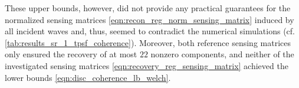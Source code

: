 These upper bounds, however, did not provide
any practical guarantees for
the normalized sensing matrices
\eqref{eqn:recon_reg_norm_sensing_matrix} induced by
all incident waves and, thus, seemed to contradict
the numerical simulations
(cf. \cref{tab:results_sr_1_tpsf_coherence}).
Moreover,
both reference sensing matrices only ensured
the recovery of
at most $22$ nonzero components, and
neither of
the investigated sensing matrices
\eqref{eqn:recovery_reg_sensing_matrix} achieved
the  lower bounds
\eqref{eqn:disc_coherence_lb_welch}.
